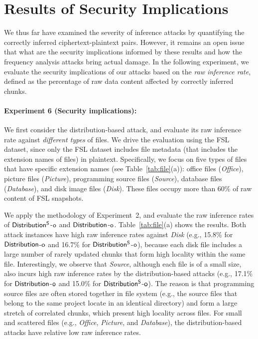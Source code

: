 \documentclass[bachelor]{thesis-uestc}
\begin{document}
\section{Results of Security Implications}
\label{sec:case}
We thus far have examined the severity of inference attacks by quantifying the
correctly inferred ciphertext-plaintext pairs.  However, it remains an open
issue that what are the security implications informed by these results and
how the frequency analysis attacks bring actual damage. In the following
experiment, we evaluate the security implications of our attacks based on the
{\em raw inference rate}, defined as the percentage of raw data content
affected by correctly inferred chunks.   




\paragraph{Experiment 6 (Security implications):}
We first consider the distribution-based attack, and evaluate its raw
inference rate against {\em different types} of files. We drive the evaluation
using the FSL dataset, since only the FSL dataset includes file metadata (that
includes the extension names of files) in plaintext. Specifically, we focus on
five types of files that have specific extension names (see
Table~\ref{tab:file}(a)): office files ({\em Office}), picture files 
({\em Picture}), programming source files ({\em Source}), database files 
({\em Database}), and disk image files ({\em Disk}). These files occupy more
than 60\% of raw content of FSL snapshots.   

We apply the methodology of Experiment~2, and evaluate the raw inference
rates of $\sf Distribution^S$-$\sf o$ and $\sf Distribution$-$\sf o$. 
Table~\ref{tab:file}(a) shows the results. Both attack instances have high raw
inference rates against {\em Disk} (e.g., 15.8\% for 
$\sf Distribution$-$\sf o$ and 16.7\% for $\sf Distribution^S$-$\sf o$),
because each disk file includes a large number of rarely updated chunks that
form high locality within the same file. Interestingly, we observe that 
{\em Source}, although each file is of a small size, also incurs high raw
inference rates by the distribution-based attacks (e.g., 17.1\% for 
$\sf Distribution$-$\sf o$ and 15.0\% for $\sf Distribution^S$-$\sf o$). The
reason is that programming source files are often stored together in file system
(e.g., the source files that belong to the same project locate in an identical
directory) and form a large stretch of correlated chunks, which present high
locality across files. For small and scattered files (e.g., {\em Office}, 
{\em Picture}, and {\em Database}), the distribution-based attacks have
relative low raw inference rates.     
\end{document}
